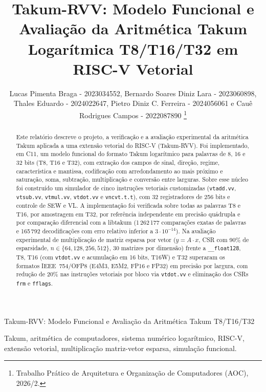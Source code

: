 \documentclass[journal]{IEEEtran}
\begin{document}
\title{Takum-RVV: Modelo Funcional e Avaliação da Aritmética Takum
Logarítmica T8/T16/T32 em RISC-V Vetorial}

\author{Lucas Pimenta Braga - 2023034552,
        Bernardo Soares Diniz Lara - 2023060898,
        Thales Eduardo - 2024022647,
        Pietro Diniz C. Ferreira - 2024056061 e
        Cauê Rodrigues Campos - 2022087890
\thanks{Trabalho Prático de Arquitetura e Organização de Computadores (AOC), 2026/2.}}

%
{Takum-RVV: Modelo Funcional e Avaliação da Aritmética Takum T8/T16/T32}

\maketitle

\begin{abstract}
Este relatório descreve o projeto, a verificação e a avaliação experimental
da aritmética Takum aplicada a uma extensão vetorial do RISC-V (Takum-RVV).
Foi implementado, em C11, um modelo funcional do formato Takum logarítmico
para palavras de 8, 16 e 32 bits (T8, T16 e T32), com extração dos campos de
sinal, direção, regime, característica e mantissa, codificação com
arredondamento ao mais próximo e saturação, soma, subtração, multiplicação e
conversão entre larguras. Sobre esse núcleo foi construído um simulador de
cinco instruções vetoriais customizadas (\texttt{vtadd.vv}, \texttt{vtsub.vv},
\texttt{vtmul.vv}, \texttt{vtdot.vv} e \texttt{vncvt.t.t}), com 32
registradores de 256 bits e controle de SEW e VL. A implementação foi
verificada sobre todas as palavras T8 e T16, por amostragem em T32, por
referência independente em precisão quádrupla e por comparação diferencial
com a libtakum (1\,262\,177 comparações exatas de palavras e 165\,792
decodificações com erro relativo inferior a $3\cdot 10^{-14}$). Na avaliação
experimental de multiplicação de matriz esparsa por vetor ($y = A\cdot x$,
CSR com 90\% de esparsidade, $n \in \{64, 128, 256, 512\}$, 30 matrizes por
dimensão) frente a \texttt{\_\_float128}, T8, T16 (com \texttt{vtdot.vv} e
acumulação em 16 bits, T16W) e T32 superaram os formatos IEEE~754/OFP8
(E4M3, E5M2, FP16 e FP32) em precisão por largura, com redução de 20\% nas
instruções vetoriais por bloco via \texttt{vtdot.vv} e eliminação dos CSRs
\texttt{frm} e \texttt{fflags}.
\end{abstract}

\begin{IEEEkeywords}
Takum, aritmética de computadores, sistema numérico logarítmico, RISC-V,
extensão vetorial, multiplicação matriz-vetor esparsa, simulação funcional.
\end{IEEEkeywords}
\end{document}
